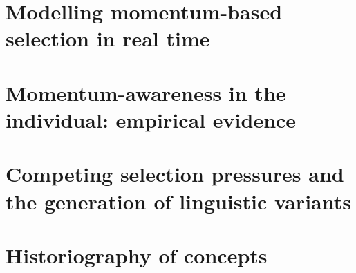 \documentclass[oneside]{book}
\begin{document}
\chapter[Momentum-based selection in real time]{Modelling momentum-based selection in real time}
\label{ch:momentummodel}


\chapter[Momentum-awareness in the individual]{Momentum-awareness in the individual: empirical evidence}
\label{ch:shetland}



\chapter[Asymmetric generation of variants]{Competing selection pressures and the generation of linguistic variants}
\label{ch:bigpicture}


%



\printindex

\appendix
\chapter{Historiography of concepts}
\label{app:concepts}
%
\end{document}
